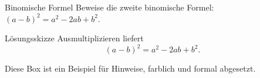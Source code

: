 \documentclass[11pt,a4paper,oneside]{article}
\begin{document}
	\begin{aufgabe}{Binomische Formel}
		Beweise die zweite binomische Formel: \((a-b)^2 = a^2 - 2ab + b^2\).
	\end{aufgabe}
	
	\begin{loesung}{Lösungsskizze}
		Ausmultiplizieren liefert
		\[
		(a-b)^2 = a^2 - 2ab + b^2.
		\]
	\end{loesung}
	
	\begin{infobox}
		Diese Box ist ein Beispiel für Hinweise, farblich und formal abgesetzt.
	\end{infobox}
	
\end{document}
